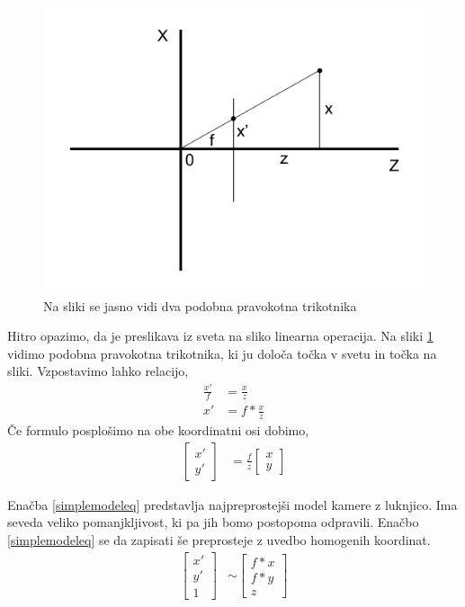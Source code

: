 \documentclass[a4paper, 12pt]{book}
\begin{document}
\begin{figure}[H]
\centering
\includegraphics[width=\textwidth,height=\textheight,keepaspectratio]{similar_triangles_2.png}
\caption{Na sliki se jasno vidi dva podobna pravokotna trikotnika}
\label{similar2}
\end{figure}

Hitro opazimo, da je preslikava iz sveta na sliko linearna operacija. Na sliki \ref{similar2} vidimo podobna pravokotna trikotnika, ki ju določa točka v svetu in točka na sliki. Vzpostavimo lahko relacijo,
\begin{align}
\frac{x'}{f} &= \frac{x}{z} \\
x' &= f * \frac{x}{z}
\end{align}
Če formulo posplošimo na obe koordinatni osi dobimo,
\begin{align}
\begin{bmatrix}
x' \\
y'
\end{bmatrix}
&= \frac{f}{z}
\begin{bmatrix}
x \\
y
\end{bmatrix}
\label{simplemodeleq}
\end{align}

Enačba \eqref{simplemodeleq} predstavlja najpreprostejši model kamere z luknjico. Ima seveda veliko pomanjkljivost, ki pa jih bomo postopoma odpravili. Enačbo \eqref{simplemodeleq} se da zapisati še preprosteje z uvedbo homogenih koordinat.
\begin{align}
\begin{bmatrix}
x' \\
y' \\
1
\end{bmatrix}
&\sim 
\begin{bmatrix}
f*x \\
f*y \\
z
\end{bmatrix}
\end{align}
\end{document}

